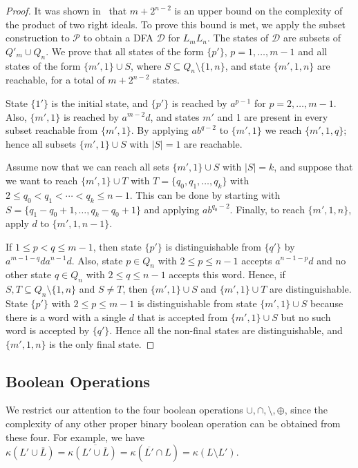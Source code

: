 \documentclass[final]{dmtcs-episciences}
\renewcommand{\le}{\leqslant}
\newcommand{\ol}{\overline}
\newcommand{\cD}{{\mathcal D}}
\newcommand{\cP}{{\mathcal P}}
\theoremstyle{definition}
\theoremstyle{remark}
\begin{document}
\begin{proof}
It was shown in~\cite{BJL13} that $m+2^{n-2}$ is an upper bound on the complexity of the product of two right ideals. To prove this bound is met, 
we apply the subset construction to $\cP$ to obtain a DFA $\cD$ for $L_mL_n$.
The states of $\cD$ are subsets of $Q'_m\cup Q_n$.
We prove that all states of the form $\{p'\}$, $p=1,\ldots,m-1$ and all states of the form
$\{m',1\}\cup S$, where $S\subseteq Q_n\setminus\{1,n\}$, and state 
$\{m',1,n\}$ are reachable, for a total of $m+2^{n-2}$ states.


State $\{1'\}$ is the initial state, and  $\{p'\}$ is reached by $a^{p-1}$ for $p=2,\ldots,m-1$.
Also, $\{m',1\}$ is reached by $a^{m-2}d$, and  
states $m'$ and 1 are present in every subset reachable from $\{m',1\}$. 
By applying $ab^{q-2}$ to $\{m',1\}$ we reach $\{m',1,q\}$; hence all subsets 
$\{m',1\}\cup S$ with $|S|=1$ are reachable.

Assume now that we can reach all sets $\{m',1\}\cup S$ with $|S|=k$, and 
suppose that we want to reach $\{m',1\}\cup T$ with $T=\{q_0,q_1,\ldots,q_k\}$
with $2\le q_0<q_1<\cdots <q_k\le n-1$.
 This can be done by starting with $S=\{q_1-q_0+1, \ldots, q_k-q_0+1\}$ and applying $ab^{q_0-2}$. 
Finally, to reach $\{m',1,n\}$, apply $d$ to $\{m',1,n-1\}$.

If $1\le  p < q\le m-1$, then state $\{p'\}$ is distinguishable from $\{q'\}$ by 
$a^{m-1-q}da^{n-1}d$.
Also, state $p \in Q_n$ with $2\le p \le n-1$ accepts $a^{n-1-p}d$ and no other state $q\in Q_n$ with $2\le q\le n-1$ accepts this word. 
Hence, if $S,T \subseteq Q_n\setminus\{1,n\}$ and $S\ne T$, then 
$\{m',1\}\cup S$ and $\{m',1\}\cup T$ are distinguishable.
State $\{p'\}$ with $2\le p\le m-1$ is distinguishable from state $\{m',1\}\cup S$
because there is a word with a single $d$ that is accepted from $\{m',1\}\cup S$
but no such word is accepted by $\{q'\}$. Hence all the non-final states are distinguishable, and $\{m',1,n\}$ is the only final state.
\end{proof}


\subsection{Boolean Operations}
\label{ssec:boolean_right}

We restrict our attention to the four boolean operations $\cup,\cap, \setminus,\oplus$, since the complexity of any other proper binary boolean operation can be obtained from these four. For example,
we have $\kappa(L' \cup\ol{L}) = \kappa \ol{ (L' \cup\ol{L} ) } = \kappa ( \ol{L'} \cap L) = \kappa(L\setminus L')$.
\end{document}
